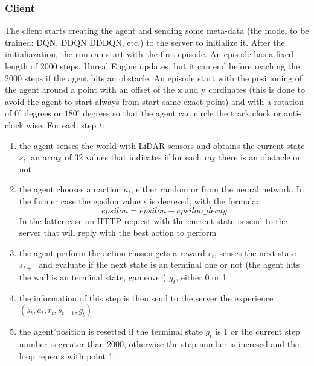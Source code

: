 \documentclass[14pt]{extarticle}
\def\sp{\vspace{5pt}}
\begin{document}
\begin{flushleft}
\subsubsection{Client}
\sp
The client starts creating the agent and sending some meta-data (the model to be trained: DQN, DDQN DDDQN, etc.) to the server to initialize it. After the initialiazation, the run can start with the first episode. An episode has a fixed length of 2000 steps, Unreal Engine updates, but it can end before reaching the 2000 steps if the agent hits an obstacle. An episode start with the positioning of the agent around a point with an offset of the x and y cordinates (this is done to avoid the agent to start always from start same exact point) and with a rotation of $0^{\circ}$ degrees or $180^{\circ}$ degrees so that the agent can circle the track clock or anti-clock wise. For each step $t$:
\begin{enumerate}
\item the agent senses the world with LiDAR sensors and obtains the current state $s_t$: an array of 32 values that indicates if for each ray there is an obstacle or not \label{point1}
\item the agent chooses an action $a_t$, either random or from the neural network. In the former case the epsilon value $\epsilon$ is decresed, with the formula:
\[epsilon = epsilon - epsilon\_decay\]
In the latter case an HTTP request with the current state is send to the server that will reply with the best action to perform
\item the agent perform the action chosen gets a reward $r_t$, senses the next state $s_{t+1}$ and evaluate if the next state is an terminal one or not (the agent hits the wall is an terminal state, gameover) $g_t$, either 0 or 1
\item the information of this step is then send to the server the experience $(s_t,a_t,r_t,s_{t+1},g_t)$
\item the agent'position is resetted if the terminal state $g_t$ is 1 or the current step number is greater than 2000, otherwise the step number is incresed and the loop repeats with point 1.
\end{enumerate}


\end{flushleft}
\end{document}
